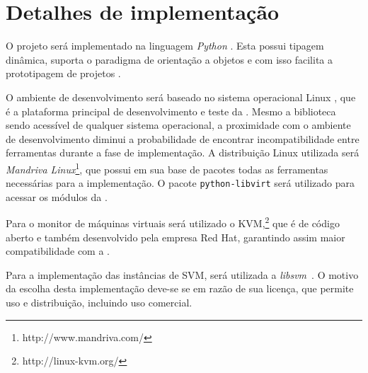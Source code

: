 \section{Detalhes de implementação}

O projeto será implementado na linguagem \emph{Python} \cite{rossum1995python}.
Esta possui tipagem dinâmica, suporta o paradigma de orientação a objetos e com
isso facilita a prototipagem de projetos \cite{lutz2006programming}.

O ambiente de desenvolvimento será baseado no sistema operacional Linux
\cite{morimoto2004entendendo}, que é a plataforma principal de
desenvolvimento e teste da \libvirt{}. Mesmo a biblioteca sendo acessível
de qualquer sistema operacional, a proximidade com o ambiente de
desenvolvimento diminui a probabilidade de encontrar incompatibilidade
entre ferramentas durante a fase de implementação. A distribuição Linux
utilizada será \emph{Mandriva Linux}\footnote{http://www.mandriva.com/},
que possui em sua base de pacotes todas as ferramentas necessárias para a
implementação. O pacote \texttt{python-libvirt} será utilizado para acessar
os módulos da \libvirt{}.

Para o monitor de máquinas virtuais será utilizado o
KVM,\footnote{http://linux-kvm.org/} que é de código aberto e também
desenvolvido pela empresa Red Hat, garantindo assim maior compatibilidade
com a \libvirt{}.

Para a implementação das instâncias de SVM, será utilizada a
\emph{libsvm}~\cite{chang2001libsvm}. O motivo da escolha desta
implementação deve-se se em razão de sua licença, que permite uso e
distribuição, incluindo uso comercial.
